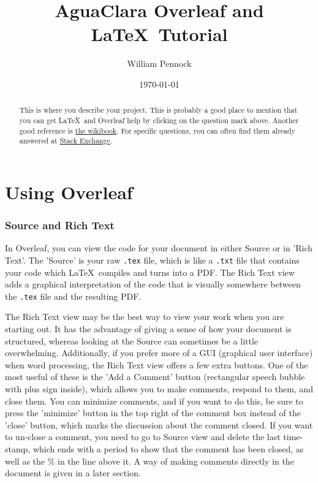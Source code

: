 \documentclass[english,12pt]{article}
\begin{document}
\title{AguaClara Overleaf and \LaTeX \ Tutorial} %
\author{William Pennock} %
\date{\today} %
\maketitle %

\begin{abstract}
This is where you describe your project. This is probably a good place to mention that you can get \LaTeX  \ and Overleaf help by clicking on the question mark above. Another good reference is \href{https://en.wikibooks.org/wiki/LaTeX}{the wikibook}. For specific questions, you can often find them already answered at \href{http://tex.stackexchange.com}{Stack Exchange}.
\end{abstract}

\part*{Using Overleaf}

\section*{Source and Rich Text} \label{sourcevrich}
In Overleaf, you can view the code for your document in either Source or in 'Rich Text'. The 'Source' is your raw \texttt{.tex} file, which is like a \texttt{.txt} file that contains your code which \LaTeX \ compiles and turns into a PDF. The Rich Text view adds a graphical interpretation of the code that is visually somewhere between the \texttt{.tex} file and the resulting PDF. 

The Rich Text view may be the best way to view your work when you are starting out. It has the advantage of giving a sense of how your document is structured, whereas looking at the Source can sometimes be a little overwhelming. Additionally, if you prefer more of a GUI (graphical user interface) when word processing, the Rich Text view offers a few extra buttons. One of the most useful of these is the 'Add a Comment' button (rectangular speech bubble with plus sign inside), which allows you to make comments, respond to them, and close them. You can minimize comments, and if you want to do this, be sure to press the 'minimize' button in the top right of the comment box instead of the 'close' button, which marks the discussion about the comment closed. If you want to un-close a comment, you need to go to Source view and delete the last time-stamp, which ends with a period to show that the comment has been closed, as well as the \% in the line above it. A way of making comments directly in the document is given in a later section.
\end{document}
